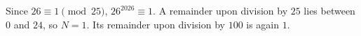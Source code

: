 Since $26\equiv1\pmod{25}$, $26^{2026}\equiv1$. A remainder upon division by $25$ lies between $0$ and $24$, so $N=1$. Its remainder upon division by $100$ is again $\boxed1$.
